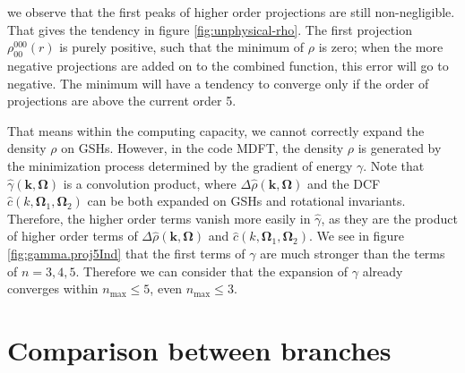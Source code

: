 we observe that the first peaks of higher order projections are still
non-negligible. That gives the tendency in figure \ref{fig:unphysical-rho}.
The first projection $\rho_{00}^{000}(r)$ is purely positive, such
that the minimum of $\rho$ is zero; when the more negative projections
are added on to the combined function, this error will go to negative.
The minimum will have a tendency to converge only if the order of
projections are above the current order 5.

That means within the computing capacity, we cannot correctly expand
the density $\rho$ on \acs{GSH}s. However, in the code MDFT, the density $\rho$ is generated by the
minimization process determined by the gradient of energy $\gamma$.
Note that $\hat{\gamma}(\mathbf{k},\mathbf{\Omega})$ is a convolution
product, where $\Delta\hat{\rho}(\mathbf{k},\mathbf{\Omega})$ and
the \acs{DCF} $\hat{c}(k,\mathbf{\Omega}_{1},\mathbf{\Omega}_{2})$
can be both expanded on \acs{GSH}s and rotational invariants. Therefore,
the higher order terms vanish more easily in $\hat{\gamma}$, as they
are the product of higher order terms of $\Delta\hat{\rho}(\mathbf{k},\mathbf{\Omega})$
and $\hat{c}(k,\mathbf{\Omega}_{1},\mathbf{\Omega}_{2})$. We see
in figure \ref{fig:gamma.proj5Ind} that the first terms of $\gamma$
are much stronger than the terms of $n=3,4,5$. Therefore we can consider
that the expansion of $\gamma$ already converges within $n_{\max}\leq5$,
even $n_{\max}\leq3$.

\section{Comparison between branches}

